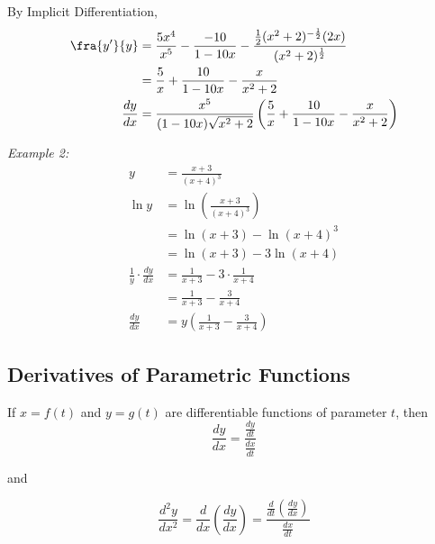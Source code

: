 \documentclass{article}
\begin{document}
            \noindent By Implicit Differentiation, \\

            \begin{align*}
                \fra{y'}{y} &= \frac{5x^4}{x^5}- \frac{-10}{1-10x} - \frac{\frac{1}{2}(x^2+2)^{-\frac{1}{2}}(2x)}{(x^2+2)^{\frac{1}{2}}} \\
                &= \frac{5}{x} + \frac{10}{1-10x} - \frac{x}{x^2+2} \\
                \frac{dy}{dx} &= \frac{x^5}{(1-10x)\sqrt{x^2+2}}\left(\frac{5}{x}+\frac{10}{1-10x}-\frac{x}{x^2+2}\right)
            \end{align*}

            \noindent \color{blue} \textit{Example 2:} \color{black} \\

            \begin{align*}
                y &= \frac{x+3}{(x+4)^3} \\
                \ln{y} &= \ln{\left(\frac{x+3}{(x+4)^3}\right)} \\
                &= \ln{(x+3)} - \ln{(x+4)^3} \\
                &= \ln{(x+3)}  - 3\ln{(x+4)} \\
                \frac{1}{y}\cdot\frac{dy}{dx} &= \frac{1}{x+3}-3\cdot\frac{1}{x+4} \\
                &= \frac{1}{x+3}-\frac{3}{x+4} \\
                \frac{dy}{dx} &= y\left(\frac{1}{x+3}-\frac{3}{x+4}\right)
            \end{align*}


        \subsection{Derivatives of Parametric Functions}
            If $x=f(t)$ and $y=g(t)$ are differentiable functions of parameter $t$, then \\

            \begin{equation*}
                \frac{dy}{dx} = \frac{\frac{dy}{dt}}{\frac{dx}{dt}}
            \end{equation*}

            \noindent and

            \begin{equation*}
                \frac{d^2y}{dx^2} = \frac{d}{dx}\left(\frac{dy}{dx}\right)
                = \frac{\frac{d}{dt}\left(\frac{dy}{dx}\right)}{\frac{dx}{dt}}
            \end{equation*}
\end{document}
